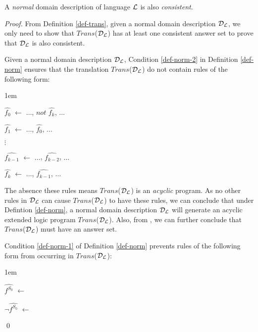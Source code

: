 \documentclass[global,twocolumn,final]{svjour}
\newenvironment{vtheorem}[1]
  {\begin{theorem}[#1]\hspace{0.25em}}
  {\end{theorem}}
\newenvironment{vproof}
  {\begin{proof}\hspace{0.25em}}
  {\qed\end{proof}}
\newenvironment{vquote}
  {\begin{list}{}{\leftmargin 1em}\item[]}
  {\end{list}}
\begin{document}
    \begin{vtheorem}{Domain Consistency}
      \label{the-cons}
      A {\em normal} domain description of language ${\cal L}$ is also
      {\em consistent}.
    \end{vtheorem}

    \begin{vproof}
      From Definition \ref{def-trans}, given a normal domain description
      ${\cal D}_{\cal L}$, we only need to show that
      $Trans$(${\cal D}_{\cal L}$) has at least one consistent answer set to
      prove that ${\cal D}_{\cal L}$ is also consistent.

      Given a normal domain description ${\cal D}_{\cal L}$, Condition
      \ref{def-norm-2} in Definition \ref{def-norm} ensures that the
      translation $Trans$(${\cal D}_{\cal L}$) do not contain rules of the
      following form:

      \begin{vquote}
        $\hat{f_{0}}$ $\leftarrow$ $\hdots$, $not$ $\hat{f_{k}}$, $\hdots$

        $\hat{f_{1}}$ $\leftarrow$ $\hdots$, $\hat{f_{0}}$, $\hdots$

        $\vdots$

        $\hat{f_{k - 1}}$ $\leftarrow$ $\hdots$, $\hat{f_{k - 2}}$, $\hdots$

        $\hat{f_{k}}$ $\leftarrow$ $\hdots$, $\hat{f_{k - 1}}$, $\hdots$
      \end{vquote}

      The absence these rules means $Trans$(${\cal D}_{\cal L}$) is an
      {\em acyclic} program. As no other rules in ${\cal D}_{\cal L}$ can
      cause $Trans$(${\cal D}_{\cal L}$) to have these rules, we can conclude
      that under Defintion \ref{def-norm}, a normal domain description
      ${\cal D}_{\cal L}$ will generate an acyclic extended logic program
      $Trans$(${\cal D}_{\cal L}$). Also, from \cite{BAR}, we can further
      conclude that $Trans$(${\cal D}_{\cal L}$) must have an answer set.

      Condition \ref{def-norm-1} of Definition \ref{def-norm} prevents rules
      of the following form from occurring in $Trans$(${\cal D}_{\cal L}$):

      \begin{vquote}
        $\hat{f^{S_{0}}}$ $\leftarrow$

        $\lnot\hat{f^{S_{0}}}$ $\leftarrow$
      \end{vquote}


\end{vproof}
\end{document}
